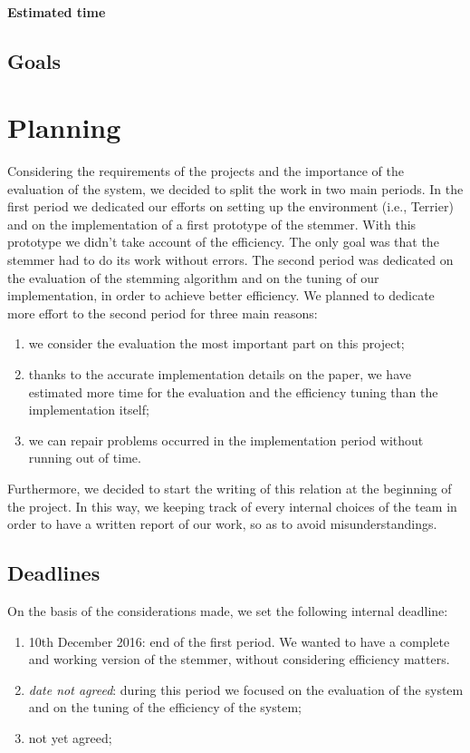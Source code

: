 \documentclass[10pt,a4paper]{article}
\begin{document}
\paragraph{Estimated time}

\subsection{Goals}
\section{Planning}
Considering the requirements of the projects and the importance of the evaluation of the system, we decided to split the work in two main periods.
In the first period we dedicated our efforts on setting up the environment (i.e., Terrier) and on the implementation of a first prototype of the stemmer. With this prototype we didn't take account of the efficiency. The only goal was that the stemmer had to do its work without errors. The second period was dedicated on the evaluation of the stemming algorithm and on the tuning of our implementation, in order to achieve better efficiency. We planned to dedicate more effort to the second period for three main reasons:
\begin{enumerate}
\item we consider the evaluation the most important part on this project;
\item thanks to the accurate implementation details on the paper, we have estimated more time for the evaluation and the efficiency tuning than the implementation itself;
\item we can repair problems occurred in the implementation period without running out of time.
\end{enumerate}

Furthermore, we decided to start the writing of this relation at the beginning of the project. In this way, we keeping track of every internal choices of the team in order to have a written report of our work, so as to avoid misunderstandings.
\subsection{Deadlines}
On the basis of the considerations made, we set the following internal deadline:
\begin{enumerate}[label=\textbf{D.\arabic*}]
\item \label{firstDeadline} 10th December 2016: end of the first period. We wanted to have a complete and working version of the stemmer, without considering efficiency matters.
\item \label{secondDeadline} \textit{date not agreed}: during this period we focused on the evaluation of the system and on the tuning of the efficiency of the system;
\item \label{thirdDeadline} not yet agreed;
\end{enumerate}
\end{document}
